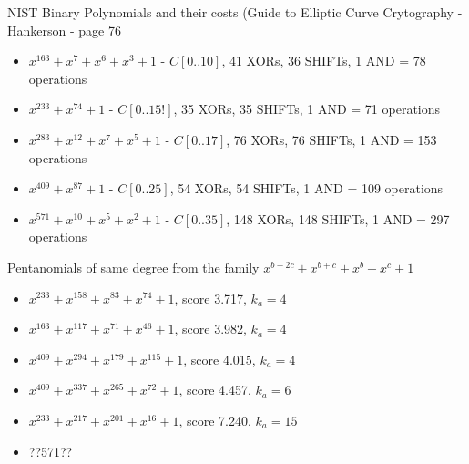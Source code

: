 NIST Binary Polynomials and their costs (Guide to Elliptic Curve Crytography - Hankerson - page 76

\begin{itemize}
\item $x^{163} + x^7 + x^6 + x^3 + 1$ - $C[0..10]$, 41 XORs, 36 SHIFTs, 1 AND = 78 operations
\item $x^{233} + x^{74} + 1$ - $C[0..15!]$, 35 XORs, 35 SHIFTs, 1 AND = 71 operations
\item $x^{283} + x^{12} + x^7 + x^5 + 1$ - $C[0..17]$, 76 XORs, 76 SHIFTs, 1 AND = 153 operations
\item $x^{409} + x^{87} + 1$ - $C[0..25]$, 54 XORs, 54 SHIFTs, 1 AND = 109 operations
\item $x^{571} + x^{10} + x^5 + x^2 + 1$ - $C[0..35]$, 148 XORs, 148 SHIFTs, 1 AND = 297 operations
\end{itemize}


Pentanomials of same degree from the family $x^{b+2c} + x^{b+c} + x^b + x^c + 1$

\begin{itemize}
\item $x^{233} + x^{158} + x^{83} + x^{74} + 1$, score 3.717, $k_a=4$
\item $x^{163} + x^{117} + x^{71} + x^{46} + 1$, score 3.982, $k_a=4$
\item $x^{409} + x^{294} + x^{179} + x^{115} + 1$, score 4.015, $k_a=4$
\item $x^{409} + x^{337} + x^{265} + x^{72} + 1$, score 4.457, $k_a=6$
\item $x^{233} + x^{217} + x^{201} + x^{16} + 1$, score 7.240, $k_a=15$
\item ??571??
\end{itemize}